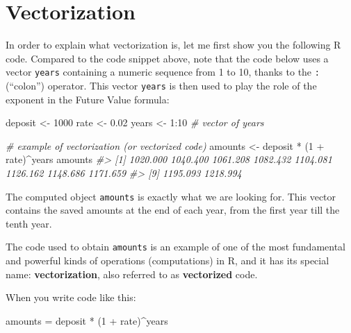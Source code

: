 \documentclass[
]{book}
\newenvironment{Shaded}{\begin{snugshade}}{\end{snugshade}}
\newcommand{\CommentTok}[1]{\textcolor[rgb]{0.56,0.35,0.01}{\textit{#1}}}
\newcommand{\DecValTok}[1]{\textcolor[rgb]{0.00,0.00,0.81}{#1}}
\newcommand{\FloatTok}[1]{\textcolor[rgb]{0.00,0.00,0.81}{#1}}
\newcommand{\NormalTok}[1]{#1}
\newcommand{\OtherTok}[1]{\textcolor[rgb]{0.56,0.35,0.01}{#1}}
\newcommand{\SpecialCharTok}[1]{\textcolor[rgb]{0.00,0.00,0.00}{#1}}
\begin{document}
\hypertarget{vectorization}{%
\section{Vectorization}\label{vectorization}}

In order to explain what vectorization is, let me first show you the following
R code. Compared to the code snippet above, note that the code below uses a
vector \texttt{years} containing a numeric sequence from 1 to 10, thanks to the \texttt{:}
(``colon'') operator. This vector \texttt{years} is then used to play the role of the
exponent in the Future Value formula:

\begin{Shaded}
\begin{Highlighting}[]
\NormalTok{deposit }\OtherTok{\textless{}{-}} \DecValTok{1000}
\NormalTok{rate }\OtherTok{\textless{}{-}} \FloatTok{0.02}
\NormalTok{years }\OtherTok{\textless{}{-}} \DecValTok{1}\SpecialCharTok{:}\DecValTok{10}  \CommentTok{\# vector of years}

\CommentTok{\# example of vectorization (or vectorized code)}
\NormalTok{amounts }\OtherTok{\textless{}{-}}\NormalTok{ deposit }\SpecialCharTok{*}\NormalTok{ (}\DecValTok{1} \SpecialCharTok{+}\NormalTok{ rate)}\SpecialCharTok{\^{}}\NormalTok{years}
\NormalTok{amounts}
\CommentTok{\#\textgreater{}  [1] 1020.000 1040.400 1061.208 1082.432 1104.081 1126.162 1148.686 1171.659}
\CommentTok{\#\textgreater{}  [9] 1195.093 1218.994}
\end{Highlighting}
\end{Shaded}

The computed object \texttt{amounts} is exactly what we are looking for. This vector
contains the saved amounts at the end of each year, from the first year till
the tenth year.

The code used to obtain \texttt{amounts} is an example of one of the most fundamental
and powerful kinds of operations (computations) in R, and it has its special
name: \textbf{vectorization}, also referred to as \textbf{vectorized} code.

When you write code like this:

\begin{Shaded}
\begin{Highlighting}[]
\NormalTok{amounts }\OtherTok{=}\NormalTok{ deposit }\SpecialCharTok{*}\NormalTok{ (}\DecValTok{1} \SpecialCharTok{+}\NormalTok{ rate)}\SpecialCharTok{\^{}}\NormalTok{years}
\end{Highlighting}
\end{Shaded}
\end{document}
